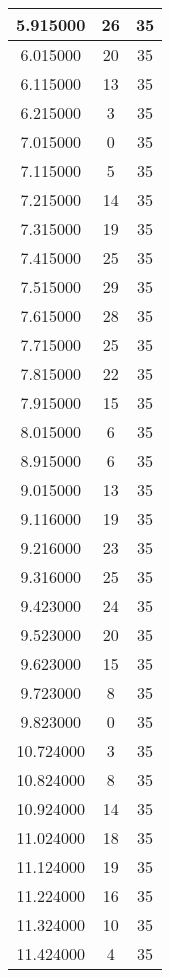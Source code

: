 \begin{longtable}[htbp]{|c|c|c|}
5.915000 & 26 & 35 \\ \hline
6.015000 & 20 & 35 \\ \hline
6.115000 & 13 & 35 \\ \hline
6.215000 & 3 & 35 \\ \hline
7.015000 & 0 & 35 \\ \hline
7.115000 & 5 & 35 \\ \hline
7.215000 & 14 & 35 \\ \hline
7.315000 & 19 & 35 \\ \hline
7.415000 & 25 & 35 \\ \hline
7.515000 & 29 & 35 \\ \hline
7.615000 & 28 & 35 \\ \hline
7.715000 & 25 & 35 \\ \hline
7.815000 & 22 & 35 \\ \hline
7.915000 & 15 & 35 \\ \hline
8.015000 & 6 & 35 \\ \hline
8.915000 & 6 & 35 \\ \hline
9.015000 & 13 & 35 \\ \hline
9.116000 & 19 & 35 \\ \hline
9.216000 & 23 & 35 \\ \hline
9.316000 & 25 & 35 \\ \hline
9.423000 & 24 & 35 \\ \hline
9.523000 & 20 & 35 \\ \hline
9.623000 & 15 & 35 \\ \hline
9.723000 & 8 & 35 \\ \hline
9.823000 & 0 & 35 \\ \hline
10.724000 & 3 & 35 \\ \hline
10.824000 & 8 & 35 \\ \hline
10.924000 & 14 & 35 \\ \hline
11.024000 & 18 & 35 \\ \hline
11.124000 & 19 & 35 \\ \hline
11.224000 & 16 & 35 \\ \hline
11.324000 & 10 & 35 \\ \hline
11.424000 & 4 & 35 \\ \hline
\end{longtable}
